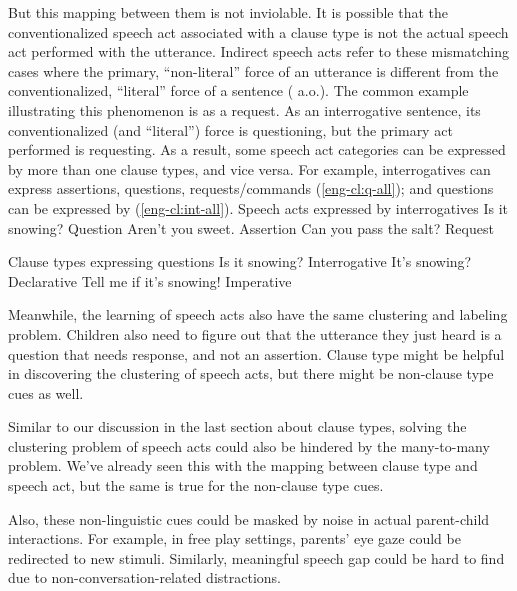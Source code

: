 But this mapping between them is not inviolable. It is possible that the conventionalized speech act associated with a clause type is not the actual speech act performed with the utterance. Indirect speech acts refer to these mismatching cases where the primary, ``non-literal'' force of an utterance is different from the conventionalized, ``literal'' force of a sentence (\citealt{searle1975tax, searle1976class, bachharnish1979, levinson1983, searlevanderveken1985, portner2018, starr2014, murraystarr2020} a.o.). The common example illustrating this phenomenon is  as a request. As an interrogative sentence, its conventionalized (and ``literal'') force is questioning, but the primary act performed is requesting. As a result, some speech act categories can be expressed by more than one clause types, and vice versa. For example, interrogatives can express assertions, questions, requests/commands (\ref{eng-cl:q-all}); and questions can be expressed by \diis{} (\ref{eng-cl:int-all}).
Speech acts expressed by interrogatives 
\bxl Is it snowing? \hfill Question
\ex Aren't you sweet. \hfill Assertion
\ex Can you pass the salt? \hfill Request
\exl
\eex

Clause types expressing questions
\bxl
Is it snowing? \hfill Interrogative
\ex It's snowing? \hfill Declarative
\ex Tell me if it's snowing! \hfill Imperative
\exl
\eex


Meanwhile, the learning of speech acts also have the same clustering and labeling problem. Children also need to figure out that the utterance they just heard is a question that needs response, and not an assertion. Clause type might be helpful in discovering the clustering of speech acts, but there might be non-clause type cues as well. %


Similar to our discussion in the last section about clause types, solving the clustering problem of speech acts could also be hindered by the many-to-many problem. We've already seen this with the mapping between clause type and speech act, but the same is true for the non-clause type cues. %


Also, these non-linguistic cues could be masked by noise in actual parent-child interactions. For example, in free play settings, parents' eye gaze could be redirected to new stimuli. Similarly, meaningful speech gap could be hard to find due to non-conversation-related distractions.  %

